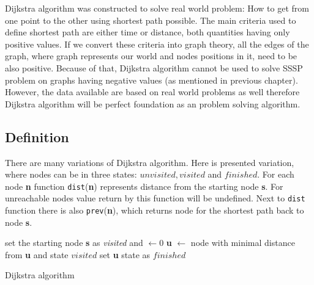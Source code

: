 \documentclass[thesis=M,english]{FITthesis}[2012/10/20]
\begin{document}
Dijkstra algorithm was constructed to solve real world problem: How to get from one point to the other using shortest path possible. %
The main criteria used to define shortest path are either time or distance, both quantities having only positive values. If we convert these criteria into graph theory, all the edges of the graph, where graph represents our world and nodes positions in it, need to be also positive.
Because of that, Dijkstra algorithm cannot be used to solve SSSP problem on graphs having negative values (as mentioned in previous chapter). However, the data available are based on real world problems as well therefore Dijkstra algorithm will be perfect foundation as an problem solving algorithm. 

\subsection{Definition}
There are many variations of Dijkstra algorithm. Here is presented variation, where nodes can be in three states: $unvisited, visited $ and $finished$. For each node \textbf{n} function \texttt{dist}(\textbf{n}) represents distance from the starting node \textbf{s}. For unreachable nodes value return by this function will be undefined. Next to \texttt{dist} function there is also \texttt{prev}(\textbf{n}), which returns node for the shortest path back to node \textbf{s}.

\begin{algorithm}[H]
 set the starting node \textbf{s} as \textit{visited} and $ \leftarrow 0$\;
 {
  \textbf{u} $\leftarrow$ node with minimal distance from \textbf{u} and state $visited$\;
  set \textbf{u} state as $finished$	\;
  {
  } 
 }
\caption{Dijkstra algorithm}\label{algo_dijkstra}
\end{algorithm}
\end{document}
